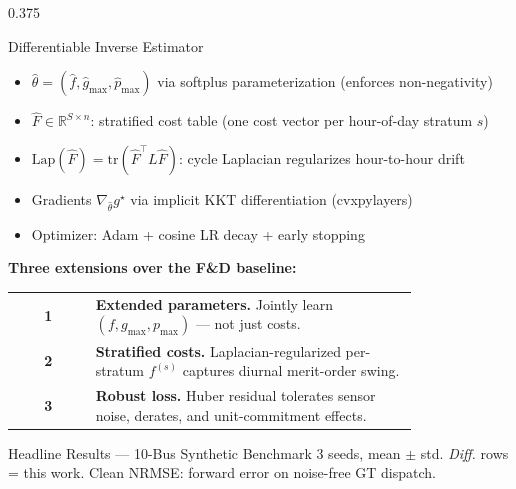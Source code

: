 \documentclass[final]{beamer}
\newcommand{\R}{\mathbb{R}}
\newcommand{\opt}{^{\star}}
\begin{document}
\begin{frame}[t]{}
\begin{columns}[t, totalwidth=\textwidth]
\begin{column}{0.375\textwidth}
\begin{block}{Differentiable Inverse Estimator}
    \begin{itemize}
      \item $\hat\theta = (\hat f,\hat g_{\max},\hat p_{\max})$ via softplus
            parameterization (enforces non-negativity)
      \item $\hat F\in\R^{S\times n}$: stratified cost table (one cost
            vector per hour-of-day stratum $s$)
      \item $\mathrm{Lap}(\hat F) = \mathrm{tr}(\hat F^\top L\hat F)$:
            cycle Laplacian regularizes hour-to-hour drift
      \item Gradients $\nabla_{\hat\theta} g\opt$ via implicit KKT
            differentiation (cvxpylayers)
      \item Optimizer: Adam + cosine LR decay + early stopping
    \end{itemize}

    \medskip
    \textbf{Three extensions over the F\&D baseline:}
    \vspace{2pt}

    \begin{tabular}{@{}c p{0.80\linewidth}@{}}
      \textcolor{StanfordCardinal}{\large\textbf{1}} &
        \textbf{Extended parameters.} Jointly learn $(f, g_{\max}, p_{\max})$
        — not just costs. \\[4pt]
      \textcolor{StanfordCardinal}{\large\textbf{2}} &
        \textbf{Stratified costs.} Laplacian-regularized per-stratum
        $f^{(s)}$ captures diurnal merit-order swing. \\[4pt]
      \textcolor{StanfordCardinal}{\large\textbf{3}} &
        \textbf{Robust loss.} Huber residual tolerates sensor noise,
        derates, and unit-commitment effects. \\
    \end{tabular}
  \end{block}

  \begin{alertblock}{Headline Results — 10-Bus Synthetic Benchmark}
    {\small 3 seeds, mean $\pm$ std. \textit{Diff.} rows = this work.
    Clean NRMSE: forward error on noise-free GT dispatch.}


\end{alertblock}
\end{column}
\end{columns}
\end{frame}
\end{document}
